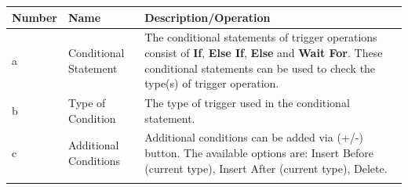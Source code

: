 \begin{enumerate}
  \begin{longtable}[]{@{}lll@{}}
  \toprule
  \begin{minipage}[b]{0.19\columnwidth}\raggedright
  Number\strut
  \end{minipage} & \begin{minipage}[b]{0.19\columnwidth}\raggedright
  Name\strut
  \end{minipage} & \begin{minipage}[b]{0.54\columnwidth}\raggedright
  Description/Operation\strut
  \end{minipage}\tabularnewline
  \midrule
  \endhead
  \begin{minipage}[t]{0.19\columnwidth}\raggedright
  a\strut
  \end{minipage} & \begin{minipage}[t]{0.19\columnwidth}\raggedright
  Conditional Statement\strut
  \end{minipage} & \begin{minipage}[t]{0.54\columnwidth}\raggedright
  The conditional statements of trigger operations consist of
  \textbf{If}, \textbf{Else If}, \textbf{Else} and \textbf{Wait For}.
  These conditional statements can be used to check the type(s) of
  trigger operation.\strut
  \end{minipage}\tabularnewline
  \begin{minipage}[t]{0.19\columnwidth}\raggedright
  b\strut
  \end{minipage} & \begin{minipage}[t]{0.19\columnwidth}\raggedright
  Type of Condition\strut
  \end{minipage} & \begin{minipage}[t]{0.54\columnwidth}\raggedright
  The type of trigger used in the conditional statement.\strut
  \end{minipage}\tabularnewline
  \begin{minipage}[t]{0.19\columnwidth}\raggedright
  c\strut
  \end{minipage} & \begin{minipage}[t]{0.19\columnwidth}\raggedright
  Additional Conditions\strut
  \end{minipage} & \begin{minipage}[t]{0.54\columnwidth}\raggedright
  Additional conditions can be added via (+/-) button. The available
  options are: Insert Before (current type), Insert After (current
  type), Delete.\strut
  \end{minipage}\tabularnewline
  \begin{minipage}[t]{0.19\columnwidth}\raggedright

\end{minipage}
\end{longtable}
\end{enumerate}
